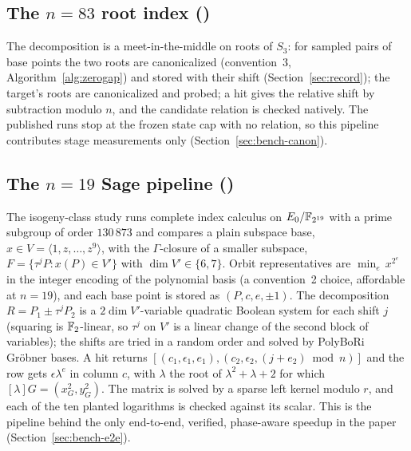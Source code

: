 \subsection{The $n=83$ root index (\thislib)}

The decomposition is a meet-in-the-middle on roots of $S_3$: for
sampled pairs of base points the two roots are canonicalized
(convention~3, Algorithm~\ref{alg:zerogap}) and stored with their
shift (Section~\ref{sec:record}); the target's roots are canonicalized
and probed; a hit gives the relative shift by subtraction modulo
$n$, and the candidate relation is checked natively. The published
runs stop at the frozen state cap with no relation, so this pipeline
contributes stage measurements only (Section~\ref{sec:bench-canon}).

\subsection{The $n=19$ Sage pipeline (\thislib)}
\label{sec:sage-pipeline}

The isogeny-class study runs complete index calculus on
$E_0/\mathbb{F}_{2^{19}}$ with a prime subgroup of order $130\,873$ and
compares a plain subspace base, $x\in V=\langle1,z,\dots,z^{9}\rangle$,
with the $\Gamma$-closure of a smaller subspace,
$F=\{\tau^jP: x(P)\in V'\}$ with $\dim V'\in\{6,7\}$. Orbit
representatives are $\min_e\,x^{2^e}$ in the integer encoding of the
polynomial basis (a convention~2 choice, affordable at $n=19$), and
each base point is stored as $(P,c,e,\pm1)$. The decomposition
$R=P_1\pm\tau^jP_2$ is a $2\dim V'$-variable quadratic Boolean system
for each shift $j$ (squaring is $\mathbb{F}_2$-linear, so $\tau^j$ on $V'$ is
a linear change of the second block of variables); the shifts are
tried in a random order and solved by PolyBoRi Gr\"obner bases. A hit
returns $[(c_1,\epsilon_1,e_1),(c_2,\epsilon_2,(j+e_2)\bmod n)]$ and
the row gets $\epsilon\lambda^{e}$ in column $c$, with $\lambda$ the
root of $\lambda^2+\lambda+2$ for which
$[\lambda]G=(x_G^2,y_G^2)$. The matrix is solved by a sparse left kernel modulo $r$, and each
of the ten planted logarithms is checked against its scalar. This is
the pipeline behind the only end-to-end, verified, phase-aware
speedup in the paper (Section~\ref{sec:bench-e2e}).
